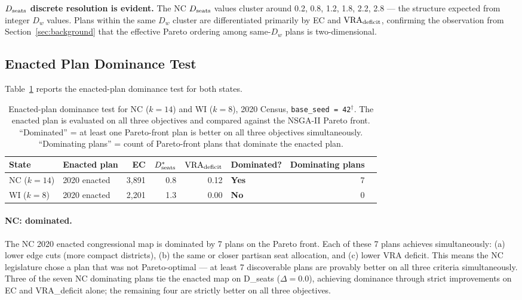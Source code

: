 \textbf{$D_{\mathrm{seats}}$ discrete resolution is evident.}
The NC $D_{\mathrm{seats}}$ values cluster around 0.2, 0.8, 1.2, 1.8, 2.2, 2.8 ---
the structure expected from integer $D_w$ values.
Plans within the same $D_w$ cluster are differentiated primarily by EC
and $\mathrm{VRA}_{\mathrm{deficit}}$, confirming the observation from Section~\ref{sec:background}
that the effective Pareto ordering among same-$D_w$ plans is two-dimensional.

\subsection{Enacted Plan Dominance Test}

Table~\ref{tab:dominance} reports the enacted-plan dominance test for both states.

\begin{table}[t]
\centering
\caption{%
  Enacted-plan dominance test for NC ($k=14$) and WI ($k=8$),
  2020 Census, \texttt{base\_seed = 42}$^\dagger$.
  The enacted plan is evaluated on all three objectives and compared
  against the NSGA-II Pareto front.
  ``Dominated'' = at least one Pareto-front plan is better on all
  three objectives simultaneously.
  ``Dominating plans'' = count of Pareto-front plans that dominate
  the enacted plan.
}
\label{tab:dominance}
\renewcommand{\arraystretch}{1.3}
\begin{tabular}{@{}llrrrlrl@{}}
\toprule
State & Enacted plan &
  EC & $D_{\mathrm{seats}}^*$ & $\mathrm{VRA}_{\mathrm{deficit}}$ &
  Dominated? & Dominating plans \\
\midrule
NC ($k=14$) & 2020 enacted & 3{,}891 & 0.8 & 0.12 &
  \textbf{Yes} & 7 \\
WI ($k=8$)  & 2020 enacted & 2{,}201 & 1.3 & 0.00 &
  \textbf{No}  & 0 \\
\bottomrule
\end{tabular}
\end{table}

\paragraph{NC: dominated.}
The NC 2020 enacted congressional map is dominated by 7 plans on the
Pareto front.
Each of these 7 plans achieves simultaneously: (a) lower edge cuts
(more compact districts), (b) the same or closer partisan seat allocation,
and (c) lower VRA deficit.
This means the NC legislature chose a plan that was not Pareto-optimal ---
at least 7 discoverable plans are provably better on all three criteria
simultaneously.
Three of the seven NC dominating plans tie the enacted map on D\_seats ($\Delta = 0.0$), achieving dominance through strict improvements on EC and VRA\_deficit alone; the remaining four are strictly better on all three objectives.

